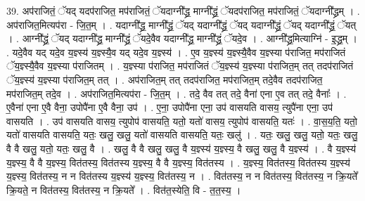 \documentclass[17pt]{extarticle}
\begin{document}
39. अप॑राजितं॒ ॅयद् यदप॑राजित॒ मप॑राजितं॒ ॅयदाग्नी᳚द्ध्र॒ माग्नी᳚द्ध्रं॒ ॅयदप॑राजित॒ मप॑राजितं॒ ॅयदाग्नी᳚द्ध्रम् । . अप॑राजित॒मित्यप॑रा - जि॒त॒म् । . यदाग्नी᳚द्ध्र॒ माग्नी᳚द्ध्रं॒ ॅयद् यदाग्नी᳚द्ध्रं॒ ॅयद् यदाग्नी᳚द्ध्रं॒ ॅयद् यदाग्नी᳚द्ध्रं॒ ॅयत् । . आग्नी᳚द्ध्रं॒ ॅयद् यदाग्नी᳚द्ध्र॒ माग्नी᳚द्ध्रं॒ ॅयदे॒वैव यदाग्नी᳚द्ध्र॒ माग्नी᳚द्ध्रं॒ ॅयदे॒व । . आग्नी᳚द्ध्र॒मित्याग्नि॑ - इ॒द्ध्र॒म् । . यदे॒वैव यद् यदे॒व य॒ज्ञ्स्य॑ य॒ज्ञ्स्यै॒व यद् यदे॒व य॒ज्ञ्स्य॑ । . ए॒व य॒ज्ञ्स्य॑ य॒ज्ञ्स्यै॒वैव य॒ज्ञ्स्या प॑राजित॒ मप॑राजितं ॅय॒ज्ञ्स्यै॒वैव य॒ज्ञ्स्या प॑राजितम् । . य॒ज्ञ्स्या प॑राजित॒ मप॑राजितं ॅय॒ज्ञ्स्य॑ य॒ज्ञ्स्या प॑राजित॒म् तत् तदप॑राजितं ॅय॒ज्ञ्स्य॑ य॒ज्ञ्स्या प॑राजित॒म् तत् । . अप॑राजित॒म् तत् तदप॑राजित॒ मप॑राजित॒म् तदे॒वैव तदप॑राजित॒ मप॑राजित॒म् तदे॒व । . अप॑राजित॒मित्यप॑रा - जि॒त॒म् । . तदे॒ वैव तत् तदे॒ वैना॑ एना ए॒व तत् तदे॒ वैनाः᳚ । . ए॒वैना॑ एना ए॒वै वैना॒ उपोपै॑ना ए॒वै वैना॒ उप॑ । . ए॒ना॒ उपोपै॑ना एना॒ उप॑ वासयति वासय॒ त्युपै॑ना एना॒ उप॑ वासयति । . उप॑ वासयति वासय॒ त्युपोप॑ वासयति॒ यतो॒ यतो॑ वासय॒ त्युपोप॑ वासयति॒ यतः॑ । . वा॒स॒य॒ति॒ यतो॒ यतो॑ वासयति वासयति॒ यतः॒ खलु॒ खलु॒ यतो॑ वासयति वासयति॒ यतः॒ खलु॑ । . यतः॒ खलु॒ खलु॒ यतो॒ यतः॒ खलु॒ वै वै खलु॒ यतो॒ यतः॒ खलु॒ वै । . खलु॒ वै वै खलु॒ खलु॒ वै य॒ज्ञ्स्य॑ य॒ज्ञ्स्य॒ वै खलु॒ खलु॒ वै य॒ज्ञ्स्य॑ । . वै य॒ज्ञ्स्य॑ य॒ज्ञ्स्य॒ वै वै य॒ज्ञ्स्य॒ वित॑तस्य॒ वित॑तस्य य॒ज्ञ्स्य॒ वै वै य॒ज्ञ्स्य॒ वित॑तस्य । . य॒ज्ञ्स्य॒ वित॑तस्य॒ वित॑तस्य य॒ज्ञ्स्य॑ य॒ज्ञ्स्य॒ वित॑तस्य॒ न न वित॑तस्य य॒ज्ञ्स्य॑ य॒ज्ञ्स्य॒ वित॑तस्य॒ न । . वित॑तस्य॒ न न वित॑तस्य॒ वित॑तस्य॒ न क्रि॒यते᳚ क्रि॒यते॒ न वित॑तस्य॒ वित॑तस्य॒ न क्रि॒यते᳚ । . वित॑त॒स्येति॒ वि - त॒त॒स्य॒ । \newline
\end{document}
